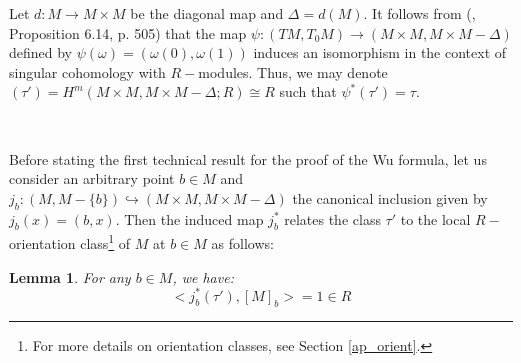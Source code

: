 \documentclass[12pt,oneside]{book}
\newtheorem{lem}    {Lemma}[chapter]
\begin{document}
    Let $d:M\to M\times M$ be the diagonal map and $\Delta=d(M)$. It follows from 
    (\cite{fadell_1}, Proposition 6.14, p. 505) that the map $\psi:(TM,T_{0}M)\to (M\times M,M\times M-\Delta)$ defined by 
    $\psi(\omega)=(\omega(0),\omega(1))$ induces an isomorphism in the context of singular cohomology with $R-$modules. Thus, we may denote 
    $(\tau')=H^{m}(M\times M,M\times M-\Delta;R)\cong R$ such that $\psi^{*}(\tau')=\tau$.

    \

    Before stating the first technical result for the proof of the Wu formula, let us consider an arbitrary point $b\in M$ and 
    $j_{b}:(M,M-\{b\})\hookrightarrow (M\times M,M\times M-\Delta)$ the canonical inclusion given by $j_{b}(x)=(b,x)$. Then the induced map 
    $j_{b}^{*}$ relates the class $\tau'$ to the local $R-$orientation 
    class\footnote{For more details on orientation classes, see Section \ref{ap_orient}.} of $M$ at $b\in M$ as follows:

    \begin{lem}\label{lema_tec_wu}
    	For any $b\in M$, we have:
    	$$ <j_{b}^{*}(\tau'),[M]_{b}>=1\in R $$
    \end{lem}
\end{document}
